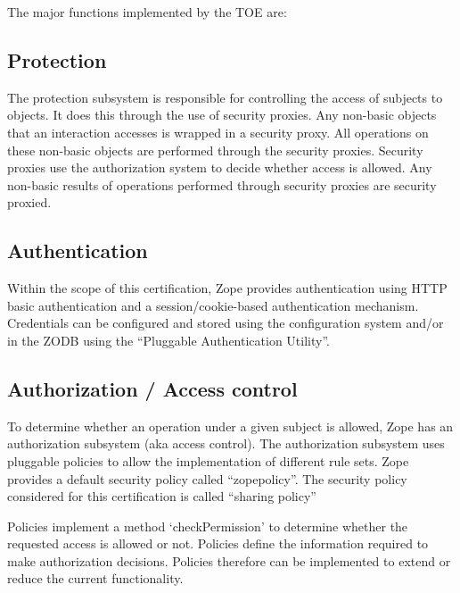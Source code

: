 \documentclass[12pt,english]{scrbook}
\begin{document}
The major functions implemented by the TOE are:




\subsection{Protection}

The protection subsystem is responsible for controlling the access of subjects
to objects.  It does this through the use of security proxies.  Any non-basic
objects that an interaction accesses is wrapped in a security proxy.  All
operations on these non-basic objects are performed through the security
proxies. Security proxies use the authorization system to decide whether access
is allowed.  Any non-basic results of operations performed through security
proxies are security proxied.




\subsection{Authentication}

Within the scope of this certification, Zope provides authentication using
HTTP basic authentication and a session/cookie-based authentication mechanism.
Credentials can be configured and stored using the configuration system and/or
in the ZODB using the ``Pluggable Authentication Utility''.




\subsection{Authorization / Access control}

To determine whether an operation under a given subject is allowed, Zope has an
authorization subsystem (aka access control). The authorization subsystem uses
pluggable policies to allow the implementation of different rule sets. Zope
provides a default security policy called ``zopepolicy''. The security policy
considered for this certification is called ``sharing policy''

Policies implement a method `checkPermission' to determine whether the
requested access is allowed or not. Policies define the information required to
make authorization decisions.  Policies therefore can be implemented to extend
or reduce the current functionality.
\end{document}

